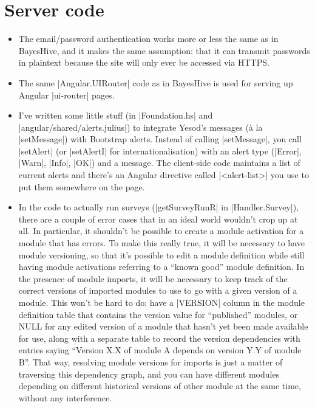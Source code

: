 \documentclass[DIV=calc,paper=a4,fontsize=11pt]{scrartcl}
\begin{document}
\section*{Server code}

\begin{itemize}
  \item{The email/password authentication works more or less the same
    as in BayesHive, and it makes the same assumption: that it can
    transmit passwords in plaintext because the site will only ever be
    accessed via HTTPS.}
  \item{The same |Angular.UIRouter| code as in BayesHive is used for
    serving up Angular |ui-router| pages.}
  \item{I've written some little stuff (in |Foundation.hs| and
    |angular/shared/alerts.julius|) to integrate Yesod's messages (à
    la |setMessage|) with Bootstrap alerts.  Instead of calling
    |setMessage|, you call |setAlert| (or |setAlertI| for
    internationalisation) with an alert type (|Error|, |Warn|, |Info|,
    |OK|) and a message.  The client-side code maintains a list of
    current alerts and there's an Angular directive called
    |<alert-list>| you use to put them somewhere on the page.}
  \item{In the code to actually run surveys (|getSurveyRunR| in
    |Handler.Survey|), there are a couple of error cases that in an
    ideal world wouldn't crop up at all.  In particular, it shouldn't
    be possible to create a module activation for a module that has
    errors.  To make this really true, it will be necessary to have
    module versioning, so that it's possible to edit a module
    definition while still having module activations referring to a
    ``known good'' module definition.  In the presence of module
    imports, it will be necessary to keep track of the correct
    versions of imported modules to use to go with a given version of
    a module.  This won't be hard to do: have a |VERSION| column in
    the module definition table that contains the version value for
    ``published'' modules, or NULL for any edited version of a module
    that hasn't yet been made available for use, along with a separate
    table to record the version dependencies with entries saying
    ``Version X.X of module A depends on version Y.Y of module B''.
    That way, resolving module versions for imports is just a matter
    of traversing this dependency graph, and you can have different
    modules depending on different historical versions of other module
    at the same time, without any interference.}
\end{itemize}
\end{document}
